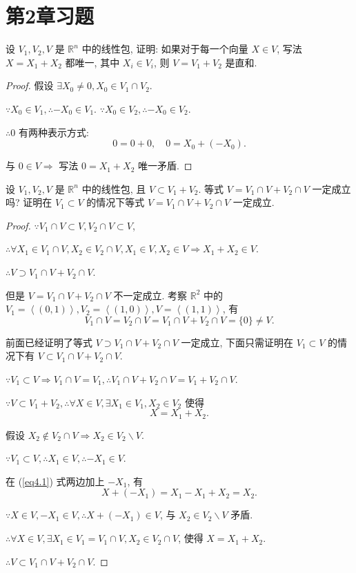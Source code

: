 \documentclass{ctexart}
\begin{document}
\section{第2章习题}
\begin{exercise}%
    设 $V_1,V_2,V$ 是 $\mathbb{R}^n$ 中的线性包, 证明: 如果对于每一个向量 $X\in V$, 写法 $X=X_1+X_2$ 都唯一, 其中 $X_i\in V_i$, 则 $V=V_1+V_2$ 是直和.
\end{exercise}
\begin{proof}
    假设 $\exists X_0\neq0,X_0\in V_1\cap V_2$.

    $\because X_0\in V_1,\therefore-X_0\in V_1$. $\because X_0\in V_2,\therefore-X_0\in V_2$.

    $\therefore0$ 有两种表示方式:
    \[0=0+0,\quad0=X_0+(-X_0).\]

    与 $0\in V\Rightarrow$ 写法 $0=X_1+X_2$ 唯一矛盾.
\end{proof}
\begin{exercise}%
    设 $V_1,V_2,V$ 是 $\mathbb{R}^n$ 中的线性包, 且 $V\subset V_1+V_2$. 等式 $V=V_1\cap V+V_2\cap V$ 一定成立吗? 证明在 $V_1\subset V$ 的情况下等式 $V=V_1\cap V+V_2\cap V$ 一定成立.
\end{exercise}
\begin{proof}
    $\because V_1\cap V\subset V,V_2\cap V\subset V$,

    $\therefore\forall X_1\in V_1\cap V,X_2\in V_2\cap V,X_1\in V,X_2\in V\Rightarrow X_1+X_2\in V$.

    $\therefore V\supset V_1\cap V+V_2\cap V$.

    但是 $V=V_1\cap V+V_2\cap V$ 不一定成立. 考察 $\mathbb{R}^2$ 中的 $V_1=\left<(0,1)\right>,V_2=\left<(1,0)\right>,V=\left<(1,1)\right>$, 有
    \[V_1\cap V=V_2\cap V=V_1\cap V+V_2\cap V=\{0\}\neq V.\]

    前面已经证明了等式 $V\supset V_1\cap V+V_2\cap V$ 一定成立, 下面只需证明在 $V_1\subset V$ 的情况下有 $V\subset V_1\cap V+V_2\cap V$.

    $\because V_1\subset V\Rightarrow V_1\cap V=V_1,\therefore V_1\cap V+V_2\cap V=V_1+V_2\cap V$.

    $\because V\subset V_1+V_2,\therefore\forall X\in V,\exists X_1\in V_1,X_2\in V_2$ 使得
    \begin{equation}\label{eq4.1}
        X=X_1+X_2.
    \end{equation}

    假设 $X_2\notin V_2\cap V\Rightarrow X_2\in V_2\backslash V$.

    $\because V_1\subset V,\therefore X_1\in V,\therefore-X_1\in V$.

    在 (\ref{eq4.1}) 式两边加上 $-X_1$, 有
    \[X+(-X_1)=X_1-X_1+X_2=X_2.\]

    $\because X\in V,-X_1\in V,\therefore X+(-X_1)\in V$, 与 $X_2\in V_2\backslash V$ 矛盾.

    $\therefore\forall X\in V,\exists X_1\in V_1=V_1\cap V,X_2\in V_2\cap V$, 使得 $X=X_1+X_2$.

    $\therefore V\subset V_1\cap V+V_2\cap V.$
\end{proof}
\end{document}
